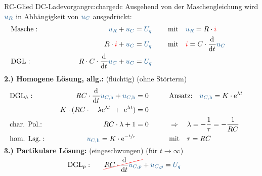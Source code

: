 {\begin{bsp}{RC-Glied DC-Ladevorgang}{rc:chargedc}
        Ausgehend von der Maschengleichung wird $\ecv{u_R}$ in Abhängigkeit von $\ecv{u_C}$ ausgedrückt:%
        \begingroup%
            \addtolength{\jot}{2pt}%
        \begin{align*}
            &\text{Masche}:&&&
                \ecv{u_R} + \ecv{u_C}  &= \ecv{U_q}&&&
                &\text{mit}\quad \ecv{u_R} = R \cdot \eci{i} \\
            &&&&
                R \cdot {\color{red} i} + \ecv{u_C}    &= \ecv{U_q}&&&
                &\text{mit}\quad \eci{i} = C \cdot \dt \ecv{u_C} \\
            &\text{DGL}:&&&
                R \cdot C \cdot \dt \ecv{u_C}  + \ecv{u_C}   &= \ecv{U_q}
                \\[-15pt]&\hphantom{R1ooooooo}&&&\hphantom{L3oooooooooooooooooooo}&\hphantom{R3ooo}&&&&\hphantom{R5oooooooooooooooooooooo}\nonumber%
            \end{align*}%
        \textbf{2.) Homogene Lösung, allg.:} (flüchtig) (ohne Störterm)%
        \begin{align*}%
            &\text{DGL}_{h}:&&&
                RC \cdot \dt \ecv{u_{C,\mathrm{h}}} + \ecv{u_{C,\mathrm{h}}} &= 0 &&&
                    &\text{Ansatz:}\quad
                    \ecv{u_{C,\mathrm{h}}} = K \cdot \mathrm{e}^{\lambda t}\\
            &&&&
                K \cdot(RC \cdot \quad\lambda \mathrm{e}^{\lambda t}\ +\ \mathrm{e}^{\lambda t}) &= 0 \\
            &\text{char. Pol.:}&&&
                RC \cdot \lambda + 1 &= 0 &&&
                    &\Rightarrow\quad \lambda = -\frac{1}{\tau} = -\frac{1}{RC}\\
            &\text{hom. Lsg.}:&&&
                \ecv{u_{C,\mathrm{h}}} = K \cdot \mathrm{e}^{-\sfrac{t}{\tau}}&&&&
                    &\text{mit}\quad \tau = RC
        \\[-15pt]&\hphantom{R1ooooooo}&&&\hphantom{L3oooooooooooooooooooo}&\hphantom{R3ooo}&&&&\hphantom{R5oooooooooooooooooooooo}\nonumber%
        \end{align*}%
        \textbf{3.) Partikulare Lösung:} (eingeschwungen) (für $t \to \infty$)%
        \begin{align*}%
            &\text{DGL}_{p}:&&&
                \redcancel{RC \cdot \dt \ecv{u_{C,p}}} + \ecv{u_{C,p}} &= \ecv{U_q} &&&

\end{align*}
\end{bsp}}
